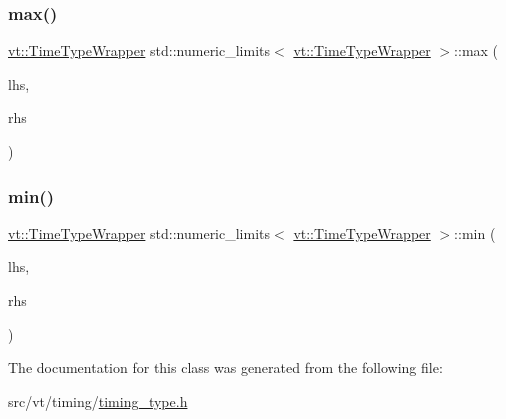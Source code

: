 \subsubsection{\texorpdfstring{max()}{max()}\hspace{0.1cm}{\footnotesize\ttfamily [2/2]}}
{\footnotesize\ttfamily \hyperlink{structvt_1_1_time_type_wrapper}{vt\+::\+Time\+Type\+Wrapper} std\+::numeric\+\_\+limits$<$ \hyperlink{structvt_1_1_time_type_wrapper}{vt\+::\+Time\+Type\+Wrapper} $>$\+::max (\begin{DoxyParamCaption}\item[{const \hyperlink{structvt_1_1_time_type_wrapper}{vt\+::\+Time\+Type\+Wrapper} \&}]{lhs,  }\item[{const \hyperlink{structvt_1_1_time_type_wrapper}{vt\+::\+Time\+Type\+Wrapper} \&}]{rhs }\end{DoxyParamCaption})\hspace{0.3cm}{\ttfamily [inline]}}

\mbox{\label{classstd_1_1numeric__limits_3_01vt_1_1_time_type_wrapper_01_4_abb4cb38645a9cacc842f030a8f0c9f73}} 
\subsubsection{\texorpdfstring{min()}{min()}}
{\footnotesize\ttfamily \hyperlink{structvt_1_1_time_type_wrapper}{vt\+::\+Time\+Type\+Wrapper} std\+::numeric\+\_\+limits$<$ \hyperlink{structvt_1_1_time_type_wrapper}{vt\+::\+Time\+Type\+Wrapper} $>$\+::min (\begin{DoxyParamCaption}\item[{const \hyperlink{structvt_1_1_time_type_wrapper}{vt\+::\+Time\+Type\+Wrapper} \&}]{lhs,  }\item[{const \hyperlink{structvt_1_1_time_type_wrapper}{vt\+::\+Time\+Type\+Wrapper} \&}]{rhs }\end{DoxyParamCaption})\hspace{0.3cm}{\ttfamily [inline]}}



The documentation for this class was generated from the following file\+:\begin{DoxyCompactItemize}
\item 
src/vt/timing/\hyperlink{timing__type_8h}{timing\+\_\+type.\+h}\end{DoxyCompactItemize}
